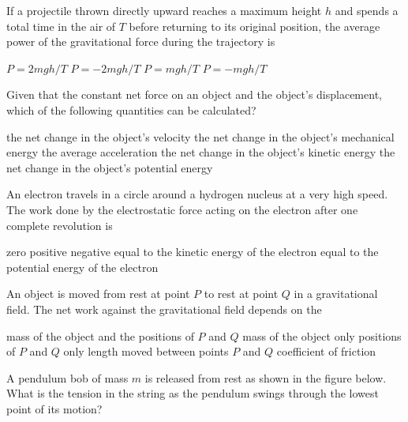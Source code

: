 \documentclass{../../../oss-ap12ibhl}
\begin{document}
\begin{questions}
  \question If a projectile thrown directly upward reaches a maximum height $h$
  and spends a total time in the air of $T$ before returning to its original
  position, the average power of the gravitational force during the trajectory
  is
  \begin{choices}
    \choice $P=2mgh/T$
    \choice $P=-2mgh/T$
    \choice $P=mgh/T$
    \choice $P=-mgh/T$
  \end{choices}
    
  \question Given that the constant net force on an object and the object's 
  displacement, which of the following quantities can be calculated?
  \begin{choices}
    \choice the net change in the object's velocity
    \choice the net change in the object's mechanical energy
    \choice the average acceleration
    \choice the net change in the object's kinetic energy
    \choice the net change in the object's potential energy
  \end{choices}
    
  \question An electron travels in a circle around a hydrogen nucleus at a very
  high speed. The work done by the electrostatic force acting on the electron
  after one complete revolution is
  \begin{choices}
    \choice zero
    \choice positive
    \choice negative
    \choice equal to the kinetic energy of the electron
    \choice equal to the potential energy of the electron
  \end{choices}
    
  \question An object is moved from rest at point $P$ to rest at point $Q$ in a
  gravitational field. The net work against the gravitational field depends
  on the
  \begin{choices}
    \choice mass of the object and the positions of $P$ and $Q$
    \choice mass of the object only
    \choice positions of $P$ and $Q$ only
    \choice length moved between points $P$ and $Q$
    \choice coefficient of friction
  \end{choices}
    
  \question A pendulum bob of mass $m$ is released from rest as shown in the
  figure below. What is the tension in the string as the pendulum swings
  through the lowest point of its motion?


\end{questions}
\end{document}
